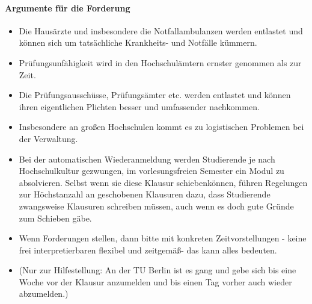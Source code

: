       \paragraph{Argumente für die Forderung}
        \begin{itemize}
          \item Die Hausärzte und insbesondere die Notfallambulanzen werden entlastet und können sich um tatsächliche Krankheits- und Notfälle kümmern.
          \item Prüfungsunfähigkeit wird in den Hochschulämtern ernster genommen als zur Zeit.
          \item Die Prüfungsausschüsse, Prüfungsämter etc. werden entlastet und können ihren eigentlichen Plichten besser und umfassender nachkommen.
          \item Insbesondere an großen Hochschulen kommt es zu logistischen Problemen bei der Verwaltung.
          \item Bei der automatischen Wiederanmeldung werden Studierende je nach Hochschulkultur gezwungen, im vorlesungsfreien Semester ein Modul zu absolvieren. Selbst wenn sie diese Klausur \glqq schieben\grqq können, führen Regelungen zur Höchstanzahl an geschobenen Klausuren dazu, dass Studierende zwangsweise Klausuren schreiben müssen, auch wenn es doch gute Gründe zum Schieben gäbe.
          \item Wenn Forderungen stellen, dann bitte mit konkreten Zeitvorstellungen - keine frei interpretierbaren \glqq flexibel und zeitgemäß\grqq - das kann alles bedeuten.
          \item (Nur zur Hilfestellung: An der TU Berlin ist es gang und gebe sich bis eine Woche vor der Klausur anzumelden und bis einen Tag vorher auch wieder abzumelden.)
        \end{itemize}


